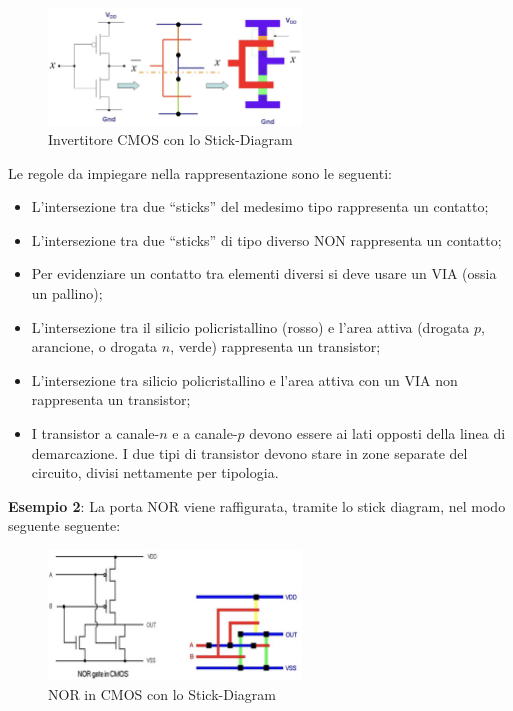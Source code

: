 \documentclass[a4paper]{extarticle}
\newcommand{\quotes}[1]{``#1''}
\begin{document}
\begin{figure}[H]
    \centering
    \includegraphics[width=0.6\textwidth]{stick-diagram-esempio-1.png}
    \caption{Invertitore CMOS con lo Stick-Diagram}
    \label{fig:invertitore_cmos_stick_diagram}
\end{figure}

\vspace{1em}
\noindent
Le regole da impiegare nella rappresentazione sono le seguenti:
\begin{itemize}
    \item L'intersezione tra due \quotes{sticks} del medesimo tipo rappresenta un contatto;
    \item L'intersezione tra due \quotes{sticks} di tipo diverso NON rappresenta un contatto;
    \item Per evidenziare un contatto tra elementi diversi si deve usare un VIA (ossia un pallino);
    \item L'intersezione tra il silicio policristallino (rosso) e l'area attiva (drogata $p$, arancione, o drogata $n$, verde) rappresenta un transistor;
    \item L'intersezione tra silicio policristallino e l'area attiva con un VIA non rappresenta un transistor;
    \item I transistor a canale-$n$ e a canale-$p$ devono essere ai lati opposti della linea di demarcazione. I due tipi di transistor devono stare in zone separate del circuito, divisi nettamente per tipologia.
\end{itemize}

\vspace{1em}
\noindent
\textbf{Esempio 2}: La porta NOR viene raffigurata, tramite lo stick diagram, nel modo seguente seguente:

\begin{figure}[H]
    \centering
    \includegraphics[width=0.6\textwidth]{stick-diagram-esempio-2.png}
    \caption{NOR in CMOS con lo Stick-Diagram}
    \label{fig:nor_cmos_stick_diagram}
\end{figure}
\end{document}
